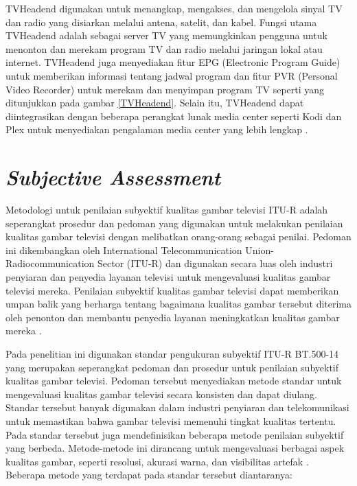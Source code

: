 TVHeadend digunakan untuk menangkap, mengakses, dan mengelola sinyal TV dan radio yang disiarkan melalui antena, satelit, dan kabel. Fungsi utama TVHeadend adalah sebagai server TV yang memungkinkan pengguna untuk menonton dan merekam program TV dan radio melalui jaringan lokal atau internet. TVHeadend juga menyediakan fitur EPG (Electronic Program Guide) untuk memberikan informasi tentang jadwal program dan fitur PVR (Personal Video Recorder) untuk merekam dan menyimpan program TV seperti yang ditunjukkan pada gambar \ref{TVHeadend}. Selain itu, TVHeadend dapat diintegrasikan dengan beberapa perangkat lunak media center seperti Kodi dan Plex untuk menyediakan pengalaman media center yang lebih lengkap \citep{Emmet2022}.


\section{\textit{Subjective Assessment}}
\hspace{1.2cm}
Metodologi untuk penilaian subyektif kualitas gambar televisi ITU-R adalah seperangkat prosedur dan pedoman yang digunakan untuk melakukan penilaian kualitas gambar televisi dengan melibatkan orang-orang sebagai penilai. Pedoman ini dikembangkan oleh International Telecommunication Union-Radiocommunication Sector (ITU-R) dan digunakan secara luas oleh industri penyiaran dan penyedia layanan televisi untuk mengevaluasi kualitas gambar televisi mereka. Penilaian subyektif kualitas gambar televisi dapat memberikan umpan balik yang berharga tentang bagaimana kualitas gambar tersebut diterima oleh penonton dan membantu penyedia layanan meningkatkan kualitas gambar mereka \citep{Rodriguez2014}.

Pada penelitian ini digunakan standar pengukuran subyektif ITU-R BT.500-14 yang merupakan seperangkat pedoman dan prosedur untuk penilaian subyektif kualitas gambar televisi. Pedoman tersebut  menyediakan metode standar untuk mengevaluasi kualitas gambar televisi secara konsisten dan dapat diulang. Standar tersebut banyak digunakan dalam industri penyiaran dan telekomunikasi untuk memastikan bahwa gambar televisi memenuhi tingkat kualitas tertentu. Pada standar tersebut juga mendefinisikan beberapa metode penilaian subyektif yang berbeda. Metode-metode ini dirancang untuk mengevaluasi berbagai aspek kualitas gambar, seperti resolusi, akurasi warna, dan visibilitas artefak \citep{IRB2019}. Beberapa metode yang terdapat pada standar tersebut diantaranya:

